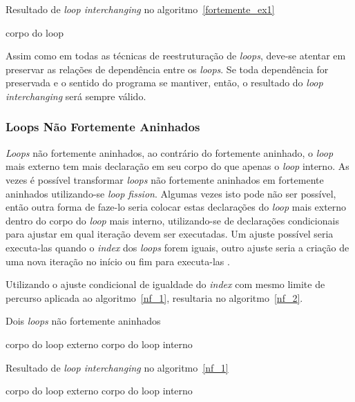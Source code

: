 \begin{algorithm}
\caption{Resultado de \textit{loop interchanging} no
        algoritmo~\ref{fortemente_ex1}}
\label{fortemente_ex2}
\begin{algorithmic}[1]

\STATE corpo do loop
\ENDFOR
\ENDFOR

\end{algorithmic}
\end{algorithm}

Assim como em todas as técnicas de reestruturação de \textit{loops}, deve-se
atentar em preservar as relações de dependência entre os \textit{loops}. 
Se toda dependência for preservada e o sentido do programa se mantiver, então, o
resultado do \textit{loop interchanging} será sempre válido.


\subsubsection{Loops Não Fortemente Aninhados}

\textit{Loops} não fortemente aninhados, ao contrário do fortemente aninhado, o
\textit{loop} mais externo tem mais declaração em seu corpo do que apenas o
\textit{loop} interno.
As vezes é  possível  transformar  \textit{loops} não fortemente aninhados em
fortemente aninhados utilizando-se \textit{loop fission}.
Algumas vezes isto pode não ser possível, então outra forma de faze-lo seria
colocar estas declarações do \textit{loop} mais externo dentro do corpo do
\textit{loop} mais interno, utilizando-se de declarações condicionais para
ajustar em qual iteração devem ser executadas. 
Um ajuste possível seria executa-las quando o \textit{index} dos \textit{loops}
forem iguais, outro ajuste seria a criação de uma nova iteração no início ou fim
para executa-las \cite{hpcfpc}.

Utilizando o ajuste condicional de igualdade  do \textit{index} com mesmo limite
de percurso aplicada ao algoritmo~\ref{nf_1}, resultaria no
algoritmo~\ref{nf_2}.

\begin{algorithm}
\caption{Dois \textit{loops} não fortemente aninhados}
\label{nf_1}
\begin{algorithmic}[1]

\STATE corpo do loop externo
\STATE corpo do loop interno
\ENDFOR
\ENDFOR

\end{algorithmic}
\end{algorithm}

\begin{algorithm}
\caption{Resultado de \textit{loop interchanging} no algoritmo~\ref{nf_1}}
\label{nf_2}
\begin{algorithmic}[1]

\STATE corpo do loop externo
\ELSE
\STATE corpo do loop interno
\ENDIF
\ENDFOR
\ENDFOR

\end{algorithmic}
\end{algorithm}


